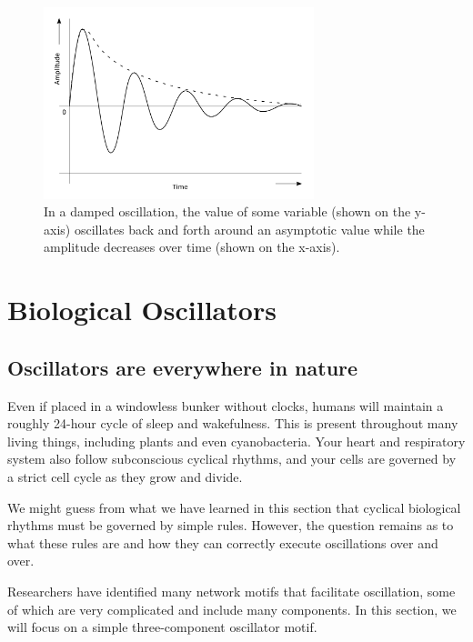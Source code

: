\begin{figure}[h]
\centering
\mySfFamily
\includegraphics[width = 0.7\textwidth]{../images/damped_oscillator.png}
\caption{In a damped oscillation, the value of some variable (shown on the y-axis) oscillates back and forth around an asymptotic value while the amplitude decreases over time (shown on the x-axis).}
\label{fig:damped_oscillator}
\end{figure}

\FloatBarrier
{}

\section{Biological Oscillators}
\label{sec:biological_oscillators}

\subsection{Oscillators are everywhere in nature}

Even if placed in a windowless bunker without clocks, humans will maintain a roughly 24-hour cycle of sleep and wakefulness. This  is present throughout many living things, including plants and even cyanobacteria. Your heart and respiratory system also follow subconscious cyclical rhythms, and your cells are governed by a strict cell cycle as they grow and divide.

We might guess from what we have learned in this section that cyclical biological rhythms must be governed by simple rules. However, the question remains as to what these rules are and how they can correctly execute oscillations over and over.

Researchers have identified many network motifs that facilitate oscillation, some of which are very complicated and include many components. In this section, we will focus on a simple three-component oscillator motif.

